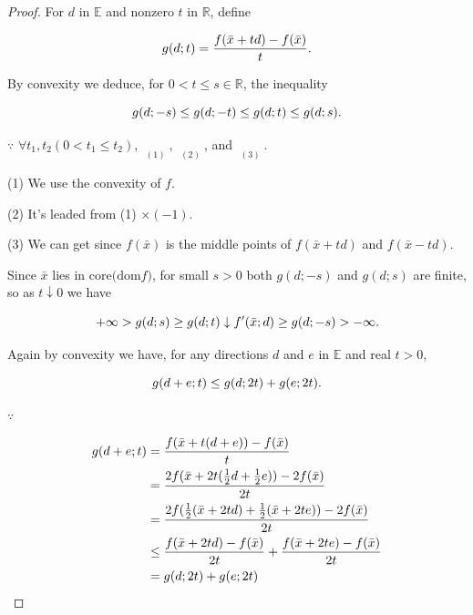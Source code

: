 \documentclass[a4paper,11pt]{jsarticle}
\begin{document}
\begin{proof}
  For $d$ in $\mathbb{E}$ and nonzero $t$ in $\mathbb{R}$, define

  \begin{equation}
    g(d;t) = \frac{f(\bar{x}+td) - f(\bar{x})}{t}. \notag
  \end{equation}

  By convexity we deduce, for $0<t\leq s \in \mathbb{R}$, the inequality

  \begin{equation}
    g(d;-s) \leq g(d;-t) \leq g(d;t) \leq g(d;s). \notag
  \end{equation}

  $\because$ $\forall t_1,t_2 (0 < t_1 \leq t_2)$, $\mathop{\underline{g(d;t_1) \leq g(d;t_2)}}\limits_{(1)}$, $\mathop{\underline{g(d;-t_2) \leq g(d;-t_1)}}\limits_{(2)}$, and $\mathop{\underline{g(d;-t_1) \leq g(d;t_1)}}\limits_{(3)}$.

  (1) We use the convexity of $f$.

  (2) It's leaded from (1) $\times (-1)$.

  (3) We can get since $f(\bar{x})$ is the middle points of $f(\bar{x}+td)$ and $f(\bar{x}-td)$.

  Since $\bar{x}$ lies in $\text{core($\text{dom}f$)}$, for small $s > 0$ both $g(d;-s)$ and $g(d;s)$ are finite, so as $t\downarrow 0$ we have

  \begin{equation}
    +\infty > g(d;s) \geq g(d;t) \downarrow f'(\bar{x};d) \geq g(d; -s) > -\infty. \notag
  \end{equation}

  Again by convexity we have, for any directions $d$ and $e$ in $\mathbb{E}$ and real $t>0$,

  \begin{equation}
    g(d+e;t) \leq g(d;2t) + g(e;2t). \notag
  \end{equation}

  $\because$

  \begin{equation}
    \begin{split}
      g(d+e;t) &= \frac{f(\bar{x}+t(d+e))-f(\bar{x})}{t}\\
      &= \frac{2f(\bar{x}+2t(\frac{1}{2}d+\frac{1}{2}e))-2f(\bar{x})}{2t}\\
      &= \frac{2f(\frac{1}{2}(\bar{x}+2td)+\frac{1}{2}(\bar{x}+2te))-2f(\bar{x})}{2t}\\
      &\leq \frac{f(\bar{x}+2td)-f(\bar{x})}{2t} + \frac{f(\bar{x}+2te)-f(\bar{x})}{2t}\\
      &= g(d;2t) + g(e;2t) \notag
    \end{split}
  \end{equation}


\end{proof}
\end{document}
